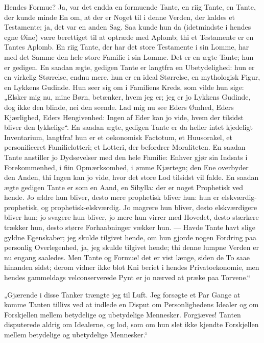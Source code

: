 \documentclass[12pt,a4paper]{book}
\newcommand{\apage}[1]{\marginnote{\footnotesize\textit{[#1]}}}
\begin{document}
 \apage{71}Hendes Formue? Ja, var det endda en formuende Tante, en riig Tante, en Tante, der kunde minde En om, at der er Noget til i denne Verden, der kaldes et Testamente; ja, det var en anden Sag. Saa kunde hun da (idetmindste i hendes egne Øine) være berettiget til at optræde med Aplomb; thi et Testamente er en Tantes Aplomb. En riig Tante, der har det store Testamente i sin Lomme, har med det Samme den hele store Familie i sin Lomme. Det er en ægte Tante; hun er gedigen. En saadan ægte, gedigen Tante er langtfra en Ubetydelighed: hun er en virkelig Størrelse, endnu mere, hun er en ideal Størrelse, en mythologisk Figur, en Lykkens Gudinde. Hun seer sig om i Familiens Kreds, som vilde hun sige: „Elsker mig nu, mine Børn, betænker, hvem jeg er; jeg er jo Lykkens Gudinde, dog ikke den blinde, nei den seende. Lad mig nu see Eders Ømhed, Eders Kjærlighed, Eders Hengivenhed: Ingen af Eder kan jo vide, hvem der tilsidst bliver den lykkelige“. En saadan ægte, gedigen Tante er da heller intet kjedeligt Inventarium, langtfra! hun er et oekonomisk Factotum, et Huusorakel, et personificeret Familielotteri; et Lotteri, der befordrer Moraliteten. En saadan Tante anstiller jo Dydsøvelser med den hele Familie: Enhver gjør sin Indsats i Forekommenhed, i fiin Opmærksomhed, i ømme Kjærtegn; den Ene overbyder den Anden, thi Ingen kan jo vide, hvor det store Lod tilsidst vil falde. En saadan ægte gedigen Tante er som en Aand, en Sibylla: der er noget Prophetisk ved hende. Jo ældre hun bliver, desto mere prophetisk bliver hun: hun er elskværdig-prophetisk, og prophetisk-elskværdig. Jo magrere hun bliver, desto elskværdigere bliver hun; jo svagere hun bliver, jo mere hun virrer med Hovedet, desto stærkere trækker hun, desto større Forhaabninger vækker hun. — Havde Tante havt slige gyldne Egenskaber; jeg skulde tilgivet hende, om hun gjorde nogen Fordring paa personlig Overlegenhed, ja, jeg skulde tilgivet hende; thi denne lumpne Verden er nu engang saaledes. Men Tante og Formue! det er vist længe, siden de To saae hinanden sidst; derom vidner ikke blot Kni\-%
 \apage{72}beriet i hendes Privatoekonomie, men hendes gammeldags velconserverede Pynt er jo nærved at præke paa Torvene.“

„Gjærende i disse Tanker trængte jeg til Luft. Jeg forsøgte et Par Gange at komme Tanten tillivs ved at indlede en Disput om Personlighedens Idealer og om Forskjellen mellem betydelige og ubetydelige Mennesker. Forgjæves! Tanten disputerede aldrig om Idealerne, og lod, som om hun slet ikke kjendte Forskjellen mellem betydelige og ubetydelige Mennesker.“
\end{document}
